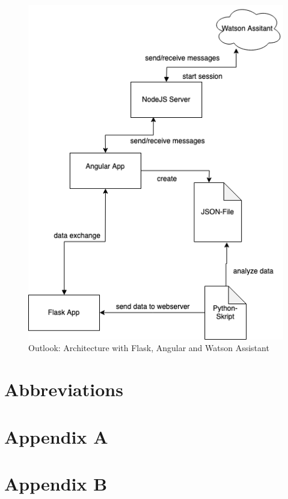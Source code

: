 \begin{figure}[h!]
	\centering
	\includegraphics[width=1\textwidth]{images/architecture_perfectworld.png}
	\caption{Outlook: Architecture with Flask, Angular and Watson Assistant}
	\label{architecture_perfect}
\end{figure}

\chapter{Abbreviations}


\printbibliography[heading=bibintoc]

\chapter{Appendix A}\label{appendix a}

\chapter{Appendix B}\label{appendix b}



